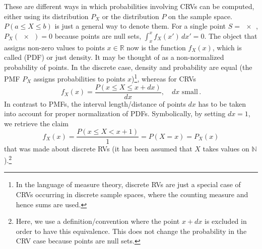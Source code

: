 These are different ways in which probabilities involving CRVs can be computed, either using its distribution $P_X$ or the distribution $P$ on the sample space. $P(a \leq X \leq b)$ is just a general way to denote them. 
For a single point $S = \qty{x}$, $P_X(\qty{x}) = 0$ because points are null sets, $\int_x^x f_X(x') \, dx' = 0$. The object that assigns non-zero values to points $x \in \mathbb{R}$ now is the function $f_X(x)$, which is called  (PDF) or just density. It may be thought of as a non-normalized probability of points. In the discrete case, density and probability are equal (the PMF $P_X$ assigns probabilities to points $x$)\footnote{In the language of measure theory, discrete RVs are just a special case of CRVs occurring in discrete sample spaces, where the counting measure and hence sums are used.}, whereas for CRVs
\begin{equation}\label{eq:def_PDF}
f_X(x) = \frac{P(x \leq X \leq x + dx)}{dx}, \quad dx \text{ small} \, .
\end{equation}
In contrast to PMFs, the interval length/distance of points $dx$ has to be taken into account for proper normalization of PDFs. Symbolically, by setting $dx = 1$, we retrieve the claim
\begin{equation}
f_X(x) = \frac{P(x \leq X < x + 1)}{1} = P(X = x) = P_X(x)
\end{equation}
that was made about discrete RVs (it has been assumed that $X$ takes values on $\mathbb{N}$).\footnote{Here, we use a definition/convention where the point $x + dx$ is excluded in order to have this equivalence. This does not change the probability in the CRV case because points are null sets.}


